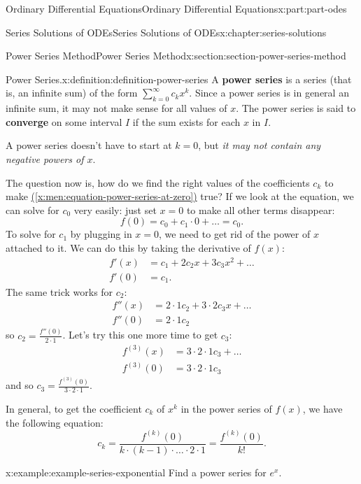 \documentclass[twoside,10pt,]{book}
\newcommand{\xreffont}{\relax}
\newcommand{\terminology}[1]{\textbf{#1}}
\numberwithin{equation}{part}
\newcommand{\amp}{&}
\begin{document}
\begin{partptx}{Ordinary Differential Equations}{}{Ordinary Differential Equations}{}{}{x:part:part-odes}
\begin{chapterptx}{Series Solutions of ODEs}{}{Series Solutions of ODEs}{}{}{x:chapter:series-solutions}
\begin{sectionptx}{Power Series Method}{}{Power Series Method}{}{}{x:section:section-power-series-method}
\begin{definition}{Power Series.}{x:definition:definition-power-series}
A \terminology{power series} is a series (that is, an infinite sum) of the form \(\sum_{k=0}^{\infty}c_{k}x^{k}\). Since a power series is in general an infinite sum, it may not make sense for all values of \(x\). The power series is said to \terminology{converge} on some interval \(I\) if the sum exists for each \(x\) in \(I\).%
\end{definition}
A power series doesn't have to start at \(k=0\), but \emph{it may not contain any negative powers of \(x\)}.%
\par
The question now is, how do we find the right values of the coefficients \(c_{k}\) to make \hyperref[x:men:equation-power-series-at-zero]{({\xreffont\ref{x:men:equation-power-series-at-zero}})} true? If we look at the equation, we can solve for \(c_{0}\) very easily: just set \(x=0\) to make all other terms disappear:%
\begin{equation*}
f(0) = c_{0} + c_{1}\cdot0+\dots = c_{0}.
\end{equation*}
To solve for \(c_{1}\) by plugging in \(x=0\), we need to get rid of the power of \(x\) attached to it. We can do this by taking the derivative of \(f(x)\):%
\begin{align*}
f'(x) \amp= c_{1} + 2c_{2}x + 3c_{3}x^{2} + \dots\\
f'(0) \amp= c_{1}\text{.}
\end{align*}
The same trick works for \(c_{2}\):%
\begin{align*}
f''(x) \amp= 2\cdot1c_{2} + 3\cdot2c_{3}x+\dots\\
f''(0) \amp= 2\cdot1c_{2}
\end{align*}
so \(c_{2} = \frac{f''(0)}{2\cdot1}\). Let's try this one more time to get \(c_{3}\):%
\begin{align*}
f^{(3)}(x) \amp= 3\cdot2\cdot1c_{3} + \dots\\
f^{(3)}(0) \amp= 3\cdot2\cdot1c_{3}
\end{align*}
and so \(c_{3} = \frac{f^{(3)}(0)}{3\cdot2\cdot1}\).%
\par
In general, to get the coefficient \(c_{k}\) of \(x^{k}\) in the power series of \(f(x)\), we have the following equation:%
%
\begin{equation}
c_{k} = \frac{f^{(k)}(0)}{k\cdot(k-1)\cdot\dots\cdot2\cdot1} = \frac{f^{(k)}(0)}{k!}.\label{x:men:equation-power-series-coefficients-at-zero}
\end{equation}
\begin{example}{}{x:example:example-series-exponential}%
Find a power series for \(e^{x}\).%
\par\smallskip%

\end{example}
\end{sectionptx}
\end{chapterptx}
\end{partptx}
\end{document}
